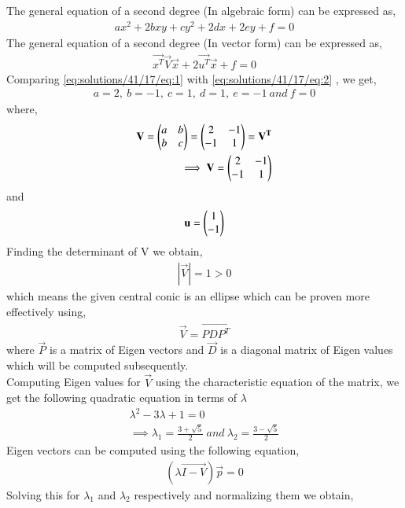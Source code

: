 The general equation of a second degree (In algebraic form) can be expressed as,
\begin{align}
ax^2 + 2bxy + cy^2 + 2dx + 2ey + f = 0 \label{eq:solutions/41/17/eq:2}
\end{align}
The general equation of a second degree (In vector form) can be expressed as,
\begin{align}
\vec{x^T}\vec{V}\vec{x} + 2\vec{u^T}\vec{x} + f = 0
\end{align}
Comparing \eqref{eq:solutions/41/17/eq:1} with \eqref{eq:solutions/41/17/eq:2} , we get,
\begin{align}
a = 2, \ b = -1, \ c = 1, \ d = 1, \ e = -1 \ and \ f = 0
\end{align}
where,
\begin{align}
\mathbf{V} = \begin{pmatrix}a & b \\ b & c\end{pmatrix} = \begin{pmatrix}2 & -1 \\ -1 & 1\end{pmatrix} = \mathbf{V^T}\\
\implies \mathbf{V} = \begin{pmatrix}2 & -1 \\ -1 & 1\end{pmatrix}
\end{align}
and
\begin{align}
\mathbf{u} = \begin{pmatrix}1 \\ -1\end{pmatrix}    
\end{align}
Finding the determinant of V we obtain, 
\begin{align}
|\vec{V}| = 1 > 0
\end{align}
which means the given central conic is an ellipse which can be proven more effectively using,
\begin{align}
\vec{V} = \vec{PDP^T}\label{eq:solutions/41/17/eq:9}    
\end{align}
where $\vec{P}$ is a matrix of Eigen vectors and $\vec{D}$ is a diagonal matrix of Eigen values which will be computed subsequently.\\
Computing Eigen values for $\vec{V}$ using the characteristic equation of the matrix, we get the following quadratic equation in terms of $\lambda$
\begin{align}
\lambda^{2} - 3\lambda + 1 = 0\\
\implies \lambda_{1} = \frac{3 + \sqrt{5}}{2} \ and \ \lambda_{2} = \frac{3 - \sqrt{5}}{2}
\end{align}
Eigen vectors can be computed using the following equation,
\begin{align}
(\lambda\vec{I - V})\vec{p} = 0
\end{align}
Solving this for $\lambda_{1}$ and $\lambda_{2}$ respectively and normalizing them we obtain,
